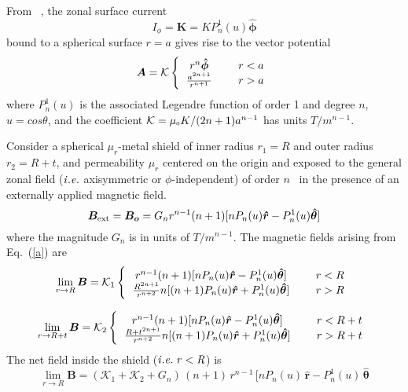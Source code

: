 From ~\cite{CB1, smythe}, the zonal surface current
\begin{equation}\label{i}
I_\phi=\bm{K}=KP_n^1(u)\bm{\hat{\phi}}
\end{equation}
bound to a spherical surface $r=a$ gives rise to the vector potential
\begin{equation}\label{a}
\bm A =\mathcal{K} 
\left \{
  \begin{tabular}{ccc}
  $r^n \bm{\hat{\phi}}$ &  & $r< a$  \\
  $\frac{a^{2n+1}}{r^{n+1}}$ &  & $r> a$ 
  \end{tabular}
 \right.
\end{equation}
where $P_n^1(u)$ is the associated Legendre function of order 1 and degree $n$,  $u=cos\theta$, and the coefficient $\mathcal{K}={\mu_{\scriptscriptstyle 0} K}/{(2n+1)a^{n-1}}$ has units $T/m^{n-1}$.

Consider a spherical $\mu_r$-metal shield of inner radius $r_1=R$ and outer radius $r_2=R+t$, and permeability $\mu_r$ centered on the origin and exposed to the general zonal field ($\it{i.e.}$ axisymmetric or $\phi$-independent) of order $n$~\cite{CB1, smythe} in the presence of an externally applied magnetic field. 
\begin{equation}\label{bo}
\bm B_{\rm ext} = \bm{B_o} = G_n r^{n-1} (n+1)[n P_n(u) \bm{\hat{r}} -  P_n^1(u)  \bm{\hat{\theta}} ] 
\end{equation}
where the magnitude $G_n$ is in units of $T/m^{n-1}$.
The magnetic fields arising from Eq.~(\ref{a}) are
\begin{equation}\label{r=R}
\lim_{r\to R}\bm B =\mathcal{K}_1
\left \{
  \begin{tabular}{ccc}
  $r^{n-1}(n+1)[n P_n(u)\bm{\hat{r}} -  P_n^1(u) \bm{\hat{\theta}} ]$ &  & $r< R$  \\
  $\frac{R^{2n+1}}{r^{n+2}}
n[(n+1) P_n(u) \bm{\hat{r}} +  P_n^1(u)  \bm{\hat{\theta}} ]$ &  & $r> R$  
  \end{tabular}
\right. 
\end{equation}

\begin{equation}\label{r=R+t}
\lim_{r\to R+t}\bm B =\mathcal{K}_2
\left \{
  \begin{tabular}{ccc}
  $r^{n-1} (n+1)[n P_n(u)\bm{\hat{r}} -  P_n^1(u)\bm{\hat{\theta}} ]$ &  & $r< R+t$  \\
  $\frac{{R+t}^{2n+1}}{r^{n+2}}n[(n+1) P_n(u)\bm{\hat{r}} +  P_n^1(u) \bm{\hat{\theta}} ]$ &  & $r> R+t$  
  \end{tabular}
\right.
\end{equation}
 The net field inside the shield ($\it{i.e.}\;r<R$) is 
\begin{equation}\label{r<R}
\lim_{r\to R}\bm B = (\mathcal{K}_1+\mathcal{K}_2+G_n) \, (n+1)\, r^{n-1} \, [n P_n(u) \, \bm{\hat{r}} -  P_n^1(u)  \, \bm{\hat{\theta}}
\end{equation}

